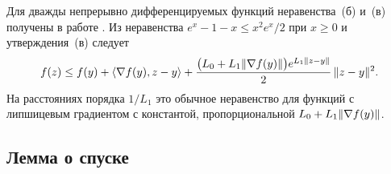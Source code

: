 Для дважды непрерывно дифференцируемых функций неравенства~(б) и~(в) получены в работе \citet[лемма~2.5]{vankov2025optimizing}. Из неравенства $e^x-1-x\le x^2e^x/2$ при $x\ge0$ и утверждения~(в) следует
\begin{equation}\label{eq:local-descent}
 f(z)\le f(y)+\langle \nabla f(y),z-y\rangle+\frac{\bigl(L_0+L_1\|\nabla f(y)\|\bigr)e^{L_1\|z-y\|}}2\,\|z-y\|^2 .
\end{equation}
На расстояниях порядка $1/L_1$ это обычное неравенство для функций с липшицевым градиентом \citep[лемма~1.2.3]{nesterov2018lectures} с константой, пропорциональной $L_0+L_1\|\nabla f(y)\|$.

\subsection{Лемма о спуске}\label{app:tools-descent}

